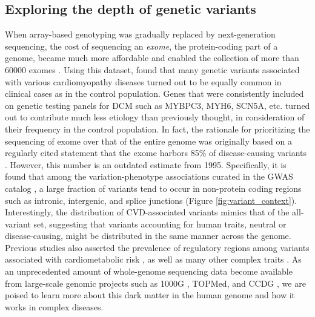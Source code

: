 \documentclass[letter]{bioinfo}
\begin{document}
\subsection*{Exploring the depth of genetic variants}	
	When array-based genotyping was gradually replaced by next-generation sequencing, the cost of sequencing an \textit{exome}, the protein-coding part of a genome, became much more affordable and enabled the collection of more than 60000 exomes \citep{Lek:2016:Analysis}. Using this dataset, \cite{Walsh:2017:Reassessment} found that many genetic variants associated with various cardiomyopathy diseases turned out to be equally common in clinical cases as in the control population. Genes that were consistently included on genetic testing panels for DCM such as MYBPC3, MYH6, SCN5A, etc. turned out to contribute much less etiology than previously thought, in consideration of their frequency in the control population.  In fact, the rationale for prioritizing the sequencing of exome over that of the entire genome was originally based on a regularly cited statement that the exome harbors 85\% of disease-causing variants \citep{Antonarakis:2001:nature}.  However, this number is an outdated estimate from 1995.  Specifically, it is found that among the variation-phenotype associations curated in the GWAS catalog \citep{MacArthur:2017:new}, a large fraction of variants tend to occur in non-protein coding regions such as intronic, intergenic, and splice junctions (Figure \ref{fig:variant_context}). Interestingly, the distribution of CVD-associated variants mimics that of the all-variant set, suggesting that variants accounting for human traits, neutral or disease-causing, might be distributed in the same manner across the genome. Previous studies also asserted the prevalence of regulatory regions among variants associated with cardiometabolic risk \citep{Franzen:2016:Cardiometabolic}, as well as many other complex traits \citep{Pickrell:2014:Joint}. As an unprecedented amount of whole-genome sequencing data become available from large-scale genomic projects such as 1000G  \citep{1000G:2015:global}, TOPMed\citep{NHLBI:2014:TransOmics}, and CCDG \citep{NHGRI:2016:CCDG}, we are poised to learn more about this dark matter in the human genome and how it works in complex diseases.
\end{document}
